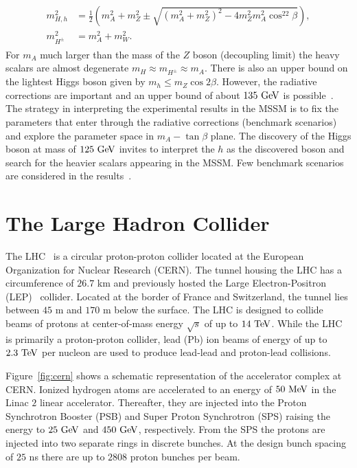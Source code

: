 \begin{eqnarray} \label{eq:mssm_mass}
\begin{aligned}
m_{H,h}^2 &= \frac{1}{2} \left (m_A^2 + m_Z^2 \pm \sqrt{(m_A^2+m_Z^2)^2-4m_Z^2m_A^2\cos^22\beta} \right ), \\
m_{H^{\pm}}^2 &= m_{A}^2 + m_{W}^2.
\end{aligned}
\end{eqnarray}   
For $m_{A}$ much larger than the mass of the $Z$ boson (decoupling limit) the heavy scalars are almost degenerate $m_{H} \approx m_{H^{\pm}} \approx m_{A}$. There is also an upper bound on the lightest Higgs boson given by $m_{h} \leq m_{Z} \cos 2\beta$. However, the radiative corrections are important and an upper bound of about $135~\mathrm{Ge\kern -0.1em V}$ is possible~\cite{Degrassi:2002fi}. The strategy in interpreting the experimental results in the MSSM is to fix the parameters that enter through the radiative corrections (benchmark scenarios) and explore the parameter space in $m_{A}-\tan \beta$ plane. The discovery of the Higgs boson at mass of $125~\mathrm{Ge\kern -0.1em V}$ invites to interpret the $h$ as the discovered boson and search for the heavier scalars appearing in the MSSM. Few benchmark scenarios are considered in the results~\cite{Heinemeyer:2011aa,Carena:2013ytb}.

\section{The Large Hadron Collider}
The LHC~\cite{1748-0221-3-08-S08001} is a circular proton-proton collider located at the European Organization for Nuclear Research (CERN). The tunnel housing the LHC has a circumference of $26.7$ km and previously hosted the Large Electron-Positron (LEP)~\cite{lep1,lep2} collider. Located at the border of France and Switzerland, the tunnel lies between $45$ m and $170$ m below the surface. The LHC is designed to collide beams of protons at center-of-mass energy $\sqrt{s}$ of up to $14~\mathrm{Te\kern -0.1em V}$. While the LHC is primarily a proton-proton collider, lead (Pb) ion beams of energy of up to $2.3~\mathrm{Te\kern -0.1em V}$ per nucleon are used to produce lead-lead  and proton-lead collisions.  
 
Figure~\ref{fig:cern} shows a schematic representation of the accelerator complex at CERN. Ionized hydrogen atoms are accelerated to an energy of $50~\mathrm{Me\kern -0.1em V}$ in the Linac $2$ linear accelerator. Thereafter, they are injected into the Proton Synchrotron Booster (PSB) and Super Proton Synchrotron (SPS) raising the energy to $25~\mathrm{Ge\kern -0.1em V}$ and $450~\mathrm{Ge\kern -0.1em V}$, respectively. From the SPS the protons are injected into two separate rings in discrete bunches. At the design bunch spacing of $25$ ns there are up to $2808$ proton bunches per beam. 

